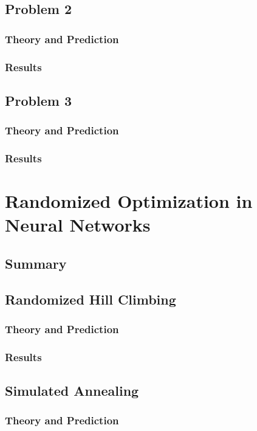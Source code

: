 \documentclass[
	letterpaper, %
]{mlreport}
\begin{document}
\subsection{Problem 2}
\subsubsection{Theory and Prediction}
\subsubsection{Results}

\subsection{Problem 3}
\subsubsection{Theory and Prediction}
\subsubsection{Results}

\section{Randomized Optimization in Neural Networks}
\subsection{Summary}

\subsection{Randomized Hill Climbing}
\subsubsection{Theory and Prediction}
\subsubsection{Results}

\subsection{Simulated Annealing}
\subsubsection{Theory and Prediction}
\end{document}
